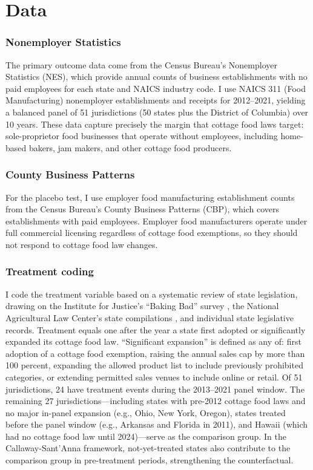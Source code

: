 \documentclass[12pt]{article}
\begin{document}
\section{Data}

\subsubsection*{Nonemployer Statistics} The primary outcome data come from the Census Bureau's Nonemployer Statistics (NES), which provide annual counts of business establishments with no paid employees for each state and NAICS industry code. I use NAICS 311 (Food Manufacturing) nonemployer establishments and receipts for 2012--2021, yielding a balanced panel of 51 jurisdictions (50 states plus the District of Columbia) over 10 years. These data capture precisely the margin that cottage food laws target: sole-proprietor food businesses that operate without employees, including home-based bakers, jam makers, and other cottage food producers.

\subsubsection*{County Business Patterns} For the placebo test, I use employer food manufacturing establishment counts from the Census Bureau's County Business Patterns (CBP), which covers establishments with paid employees. Employer food manufacturers operate under full commercial licensing regardless of cottage food exemptions, so they should not respond to cottage food law changes.

\subsubsection*{Treatment coding} I code the treatment variable based on a systematic review of state legislation, drawing on the Institute for Justice's ``Baking Bad'' survey \citep{ij2023bakingbad}, the National Agricultural Law Center's state compilations \citep{nalc2025}, and individual state legislative records. Treatment equals one after the year a state first adopted or significantly expanded its cottage food law. ``Significant expansion'' is defined as any of: first adoption of a cottage food exemption, raising the annual sales cap by more than 100 percent, expanding the allowed product list to include previously prohibited categories, or extending permitted sales venues to include online or retail. Of 51 jurisdictions, 24 have treatment events during the 2013--2021 panel window. The remaining 27 jurisdictions---including states with pre-2012 cottage food laws and no major in-panel expansion (e.g., Ohio, New York, Oregon), states treated before the panel window (e.g., Arkansas and Florida in 2011), and Hawaii (which had no cottage food law until 2024)---serve as the comparison group. In the Callaway-Sant'Anna framework, not-yet-treated states also contribute to the comparison group in pre-treatment periods, strengthening the counterfactual.
\end{document}
